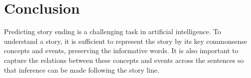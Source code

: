 \section{Conclusion}
Predicting story ending is a challenging task in artificial intelligence.
To understand a story, it is sufficient to represent the story by its key
commonsense concepts and events, preserving the informative words.
It is also important to capture the relations between these concepts and
events across the sentences so that inference can be made following
the story line. 
